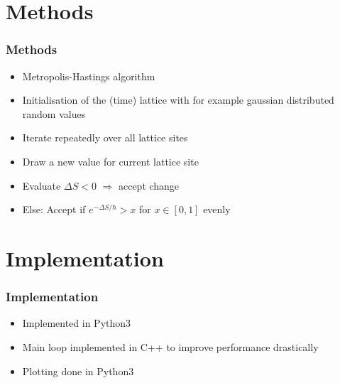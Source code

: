 \documentclass[aspectratio=169]{beamer}
\begin{document}
\section{Methods}
\begin{frame}
	\frametitle{Methods}
	\begin{itemize}
		\item Metropolis-Hastings algorithm
		\item Initialisation of the (time) lattice with for example gaussian distributed random values
		\item Iterate repeatedly over all lattice sites
		\item Draw a new value for current lattice site
		\item Evaluate $\Delta S < 0$ $\Rightarrow$ accept change
		\item Else: Accept if $e^{-\Delta S / \hbar} > x$ for $x \in [0, 1]$ evenly
	\end{itemize}
\end{frame}


\section{Implementation}
\begin{frame}
	\frametitle{Implementation}
	\begin{itemize}
		\item Implemented in Python3
		\item Main loop implemented in C++ to improve performance drastically
		\item Plotting done in Python3
	\end{itemize}
\end{frame}
\end{document}
